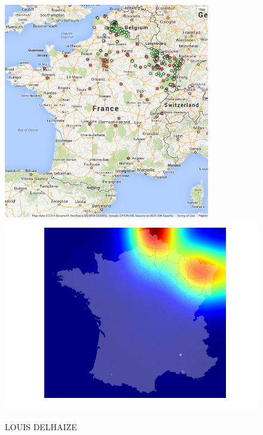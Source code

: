 \documentclass[11pt]{article}
\begin{document}
\begin{figure}[H]
    \caption{LOUIS DELHAIZE}
	\centering
		\includegraphics[width=9cm]{images/maps_group_dots/LOUIS_DELHAIZE.png}
        \includegraphics[width=12.8cm]{images/maps_group_heatmaps/LOUIS_DELHAIZE.png}
\end{figure}
\end{document}
